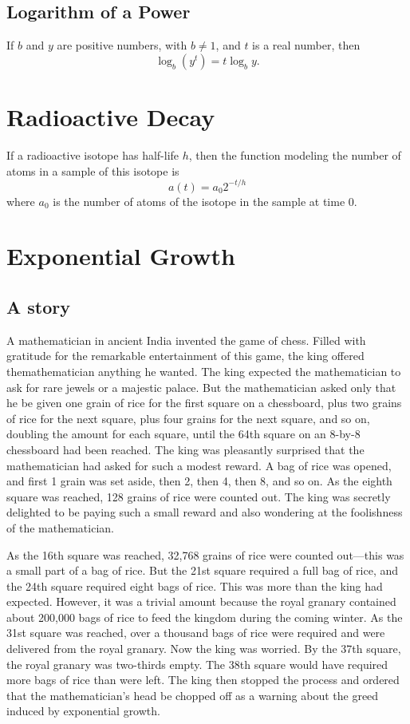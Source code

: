 \subsection{Logarithm of a Power}
If \(b\) and \(y\) are positive numbers, with \(b \neq 1\), and \(t\) is a real number, then
\[ \log_b\left(y^t\right) = t \log_b y. \]

\section{Radioactive Decay}
If a radioactive isotope has half-life \(h\), then the function modeling the number of atoms in a sample of this isotope is
\[ a(t) = a_{0}2^{-t/h}\]
where \(a_{0}\) is the number of atoms of the isotope in the sample at time \(0\).

\section{Exponential Growth}
\subsection{A story}
A mathematician in ancient India invented the game of chess. Filled with gratitude for the remarkable entertainment of this game, the king offered themathematician anything he wanted. The king expected the mathematician to ask for rare jewels or a majestic palace. But the mathematician asked only that he be given one grain of rice for the first square on a chessboard, plus two grains of rice for the next square, plus four grains for the next square, and so on, doubling the amount for each square, until the 64th square on an 8-by-8 chessboard had been reached. The king was pleasantly surprised that the mathematician had asked for such a modest reward. A bag of rice was opened, and first 1 grain was set aside, then 2, then 4, then 8, and so on. As the eighth square was reached, 128 grains of rice were counted out. The king was secretly delighted to be paying such a small reward and also wondering at the foolishness of the mathematician.

As the 16th square was reached, 32,768 grains of rice were counted out—this was a small part of a bag of rice. But the 21st square required a full bag of rice, and the 24th square required eight bags of rice. This was more than the king had expected. However, it was a trivial amount because the royal granary contained about 200,000 bags of rice to feed the kingdom during the coming winter. As the 31st square was reached, over a thousand bags of rice were required and were delivered from the royal granary. Now the king was worried. By the 37th square, the royal granary was two-thirds empty. The 38th square would have required more bags of rice than were left. The king then stopped the process and ordered that the mathematician's head be chopped off as a warning about the greed induced by exponential growth.

